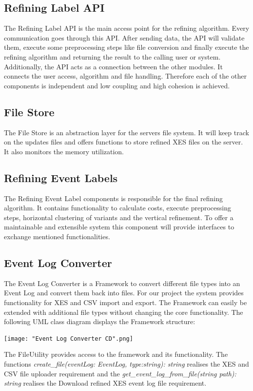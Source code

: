 \documentclass[notitlepage]{article}
\begin{document}
\begin{flushleft}
\subsection{Refining Label API}
The Refining Label API is the main access point for the refining algorithm. Every communication goes through this API. After sending data, 
the API will validate them, execute some preprocessing steps like file conversion and finally execute the refining algorithm and returning the result to the calling user or system. 
Additionally, the API acts as a connection between the other modules. It connects the user access, algorithm and file handling.
Therefore each of the other components is independent and low coupling and high cohesion is achieved.
 
\subsection{File Store}
The File Store is an abstraction layer for the servers file system. It will keep track on the updates files and offers functions to store 
refined XES files on the server. It also monitors the memory utilization.
\subsection{Refining Event Labels}
The Refining Event Label components is responsible for the final refining algorithm. 
It contains functionality to calculate costs, execute preprocessing steps, horizontal clustering of variants and the vertical refinement.
To offer a maintainable and extensible system this component will provide interfaces to exchange mentioned functionalities. 


\subsection{Event Log Converter}
The Event Log Converter is a Framework to convert different file types into an Event Log and convert them back into files. 
For our project the system provides functionality for XES and CSV import and export. 
The Framework can easily be extended with additional file types without changing the core functionality.
\medskip
The following UML class diagram displays the Framework structure:

\begin{landscape}
\texttt{[image: "Event Log Converter CD".png]}
\end{landscape}
The FileUtility provides access to the framework and its functionality.
The functions \textit{create\_file(eventLog: EventLog, type:string): string} realises the XES and CSV file uploader requirement and 
the \textit{get\_event\_log\_from\_file(string path): string} realises the Download refined XES event log file requirement. 


\end{flushleft}
\end{document}
